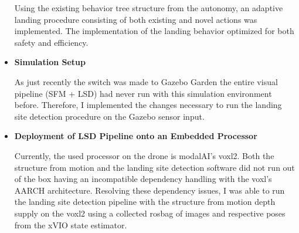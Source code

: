 \begin{itemize}
    Using the existing behavior tree structure from the autonomy, an adaptive landing procedure consisting of both existing and novel actions was implemented. The implementation of the landing behavior optimized for both safety and efficiency.
    \item \textbf{Simulation Setup}

    As just recently the switch was made to Gazebo Garden the entire visual pipeline (SFM + LSD) had never run with this simulation environment before. Therefore, I implemented the changes necessary to run the landing site detection procedure on the Gazebo sensor input. 

    \item \textbf{Deployment of LSD Pipeline onto an Embedded Processor}

    Currently, the used processor on the drone is modalAI's voxl2. Both the structure from motion and the landing site detection software did not run out of the box having an incompatible dependency handling with the voxl's AARCH architecture. Resolving these dependency issues, I was able to run the landing site detection pipeline with the structure from motion depth supply on the voxl2 using a collected rosbag of images and respective poses from the xVIO state estimator.
\end{itemize}

